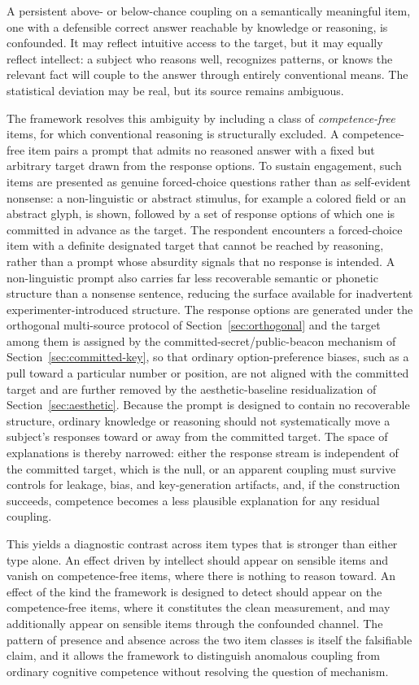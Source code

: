 \documentclass[11pt,letterpaper]{article}
\begin{document}
A persistent above- or below-chance coupling on a semantically meaningful item, one with a defensible correct answer reachable by knowledge or reasoning, is confounded. It may reflect intuitive access to the target, but it may equally reflect intellect: a subject who reasons well, recognizes patterns, or knows the relevant fact will couple to the answer through entirely conventional means. The statistical deviation may be real, but its source remains ambiguous.

The framework resolves this ambiguity by including a class of \textit{competence-free} items, for which conventional reasoning is structurally excluded. A competence-free item pairs a prompt that admits no reasoned answer with a fixed but arbitrary target drawn from the response options. To sustain engagement, such items are presented as genuine forced-choice questions rather than as self-evident nonsense: a non-linguistic or abstract stimulus, for example a colored field or an abstract glyph, is shown, followed by a set of response options of which one is committed in advance as the target. The respondent encounters a forced-choice item with a definite designated target that cannot be reached by reasoning, rather than a prompt whose absurdity signals that no response is intended. A non-linguistic prompt also carries far less recoverable semantic or phonetic structure than a nonsense sentence, reducing the surface available for inadvertent experimenter-introduced structure. The response options are generated under the orthogonal multi-source protocol of Section~\ref{sec:orthogonal} and the target among them is assigned by the committed-secret/public-beacon mechanism of Section~\ref{sec:committed-key}, so that ordinary option-preference biases, such as a pull toward a particular number or position, are not aligned with the committed target and are further removed by the aesthetic-baseline residualization of Section~\ref{sec:aesthetic}. Because the prompt is designed to contain no recoverable structure, ordinary knowledge or reasoning should not systematically move a subject's responses toward or away from the committed target. The space of explanations is thereby narrowed: either the response stream is independent of the committed target, which is the null, or an apparent coupling must survive controls for leakage, bias, and key-generation artifacts, and, if the construction succeeds, competence becomes a less plausible explanation for any residual coupling.

This yields a diagnostic contrast across item types that is stronger than either type alone. An effect driven by intellect should appear on sensible items and vanish on competence-free items, where there is nothing to reason toward. An effect of the kind the framework is designed to detect should appear on the competence-free items, where it constitutes the clean measurement, and may additionally appear on sensible items through the confounded channel. The pattern of presence and absence across the two item classes is itself the falsifiable claim, and it allows the framework to distinguish anomalous coupling from ordinary cognitive competence without resolving the question of mechanism.
\end{document}
